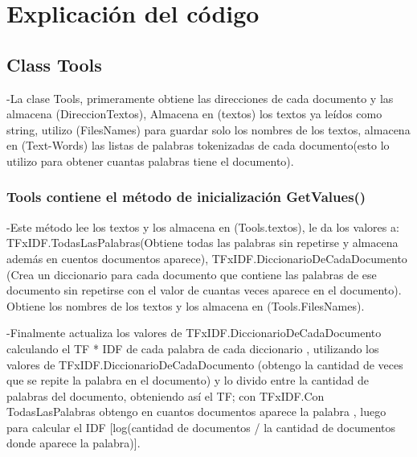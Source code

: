 \documentclass[a4paper,12pt]{article}
\begin{document}
    \newpage

    \section{Explicación del código}\label{sec:explicacion}
    \subsection{Class Tools}\label{sub:Tools}
    -La clase Tools, primeramente obtiene las direcciones de cada documento y 
    las almacena (DireccionTextos), Almacena en (textos) los textos ya leídos como string,
    utilizo (FilesNames) para guardar solo los nombres de los textos,
    almacena en (Text-Words) las listas de palabras tokenizadas de cada
    documento(esto lo utilizo para obtener cuantas palabras tiene el documento).

    \subsubsection{Tools contiene el método de inicialización GetValues()}
    -Este método lee los textos y los almacena en (Tools.textos),
    le da los valores a: TFxIDF.TodasLasPalabras(Obtiene todas las palabras sin
    repetirse y almacena además en cuentos documentos aparece),
    TFxIDF.DiccionarioDeCadaDocumento (Crea un diccionario para cada documento que contiene las palabras de ese documento sin repetirse con el valor de cuantas veces aparece en el documento).
    Obtiene los nombres de los textos y los almacena en (Tools.FilesNames).
    \vspace{0.5cm}

    -Finalmente actualiza los valores de TFxIDF.DiccionarioDeCadaDocumento calculando el TF * IDF
    de cada palabra de cada diccionario , utilizando los valores de TFxIDF.DiccionarioDeCadaDocumento 
    (obtengo la cantidad de veces que se repite la palabra en el documento) y lo divido entre la cantidad
    de palabras del documento, obteniendo así el TF; con TFxIDF.Con TodasLasPalabras obtengo en cuantos documentos aparece la palabra , luego para
    calcular el IDF [log(cantidad de documentos / la cantidad de documentos donde aparece la palabra)].
\end{document}
